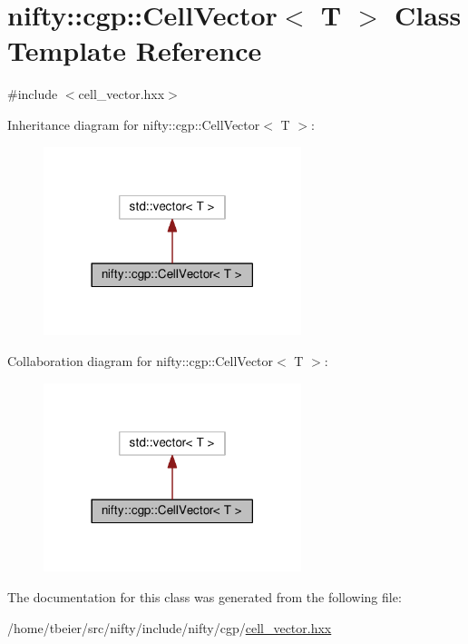 \hypertarget{classnifty_1_1cgp_1_1CellVector}{}\section{nifty\+:\+:cgp\+:\+:Cell\+Vector$<$ T $>$ Class Template Reference}
\label{classnifty_1_1cgp_1_1CellVector}


{\ttfamily \#include $<$cell\+\_\+vector.\+hxx$>$}



Inheritance diagram for nifty\+:\+:cgp\+:\+:Cell\+Vector$<$ T $>$\+:\nopagebreak
\begin{figure}[H]
\begin{center}
\leavevmode
\includegraphics[width=213pt]{classnifty_1_1cgp_1_1CellVector__inherit__graph}
\end{center}
\end{figure}


Collaboration diagram for nifty\+:\+:cgp\+:\+:Cell\+Vector$<$ T $>$\+:\nopagebreak
\begin{figure}[H]
\begin{center}
\leavevmode
\includegraphics[width=213pt]{classnifty_1_1cgp_1_1CellVector__coll__graph}
\end{center}
\end{figure}


The documentation for this class was generated from the following file\+:\begin{DoxyCompactItemize}
\item 
/home/tbeier/src/nifty/include/nifty/cgp/\hyperlink{cell__vector_8hxx}{cell\+\_\+vector.\+hxx}\end{DoxyCompactItemize}
